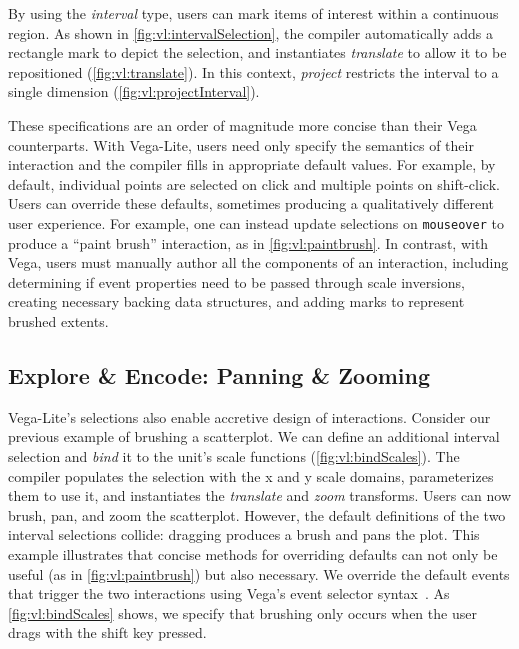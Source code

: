 By using the \emph{interval} type, users can mark items of interest within a
continuous region. As shown in \cref{fig:vl:intervalSelection}, the compiler
automatically adds a rectangle mark to depict the selection, and instantiates
\emph{translate} to allow it to be repositioned (\cref{fig:vl:translate}). In this
context, \emph{project} restricts the interval to a single dimension
(\cref{fig:vl:projectInterval}).

These specifications are an order of magnitude more concise than their Vega
counterparts. With Vega-Lite, users need only specify the semantics of their
interaction and the compiler fills in appropriate default values. For example,
by default, individual points are selected on click and multiple points on
shift-click. Users can override these defaults, sometimes producing a
qualitatively different user experience. For example, one can instead update
selections on \texttt{mouseover} to produce a ``paint brush'' interaction, as in
\cref{fig:vl:paintbrush}. In contrast, with Vega, users must manually author all
the components of an interaction, including determining if event properties need
to be passed through scale inversions, creating necessary backing data
structures, and adding marks to represent brushed extents.

\vspace{-10pt}

\subsection{Explore \& Encode: Panning \& Zooming}
\label{sec:vl:panzoom}

\vspace{-7pt}

Vega-Lite's selections also enable accretive design of interactions. Consider
our previous example of brushing a scatterplot. We can define an additional
interval selection and \emph{bind} it to the unit's scale functions
(\cref{fig:vl:bindScales}). The compiler populates the selection with the x and
y scale domains, parameterizes them to use it, and instantiates the
\emph{translate} and \emph{zoom} transforms. Users can now brush, pan, and zoom
the scatterplot. However, the default definitions of the two interval selections
collide: dragging produces a brush and pans the plot. This example illustrates
that concise methods for overriding defaults can not only be useful (as in
\cref{fig:vl:paintbrush}) but also necessary. We override the default events
that trigger the two interactions using Vega's event selector
syntax~\cite{reactive-vega-model}. As \cref{fig:vl:bindScales} shows, we specify
that brushing only occurs when the user drags with the shift key pressed.

